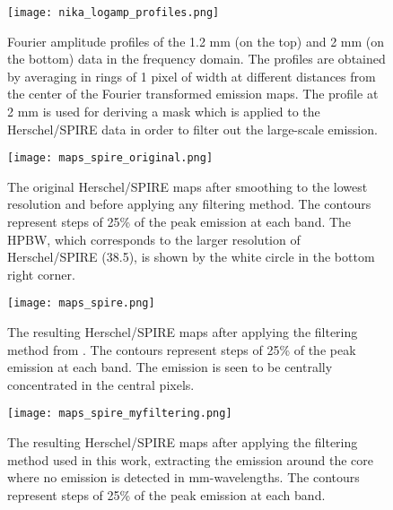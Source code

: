 \documentclass{aa}
\begin{document}
\begin{appendix}
\begin{figure} 
\begin{center}
\texttt{[image: nika\_logamp\_profiles.png]}
\end{center}
\caption{Fourier amplitude profiles of the 1.2 mm (on the top) and 2 mm (on the bottom) data in the frequency domain. The profiles are obtained by averaging in rings of 1 pixel of width at different distances from the center of the Fourier transformed emission maps. The profile at 2 mm is used for deriving a mask which is applied to the Herschel/SPIRE data in order to filter out the large-scale emission.}
\label{power}
\end{figure}

\begin{figure*} 
\begin{center}
\texttt{[image: maps\_spire\_original.png]}
\end{center}
\caption{The original Herschel/SPIRE maps after smoothing to the lowest resolution and before applying any filtering method. The contours represent steps of 25\% of the peak emission at each band. The HPBW, which corresponds to the larger resolution of Herschel/SPIRE (38.5\arcsec), is shown by the white circle in the bottom right corner.}
\label{maps_spire_original}
\end{figure*}

\begin{figure*} 
\begin{center}
\texttt{[image: maps\_spire.png]}
\end{center}
\caption{The resulting Herschel/SPIRE maps after applying the filtering method from . The contours represent steps of 25\% of the peak emission at each band. The emission is seen to be centrally concentrated in the central pixels.}
\label{maps_spire_f1}
\end{figure*}


\begin{figure*} 
\begin{center}
\texttt{[image: maps\_spire\_myfiltering.png]}
\end{center}
\caption{The resulting Herschel/SPIRE maps after applying the filtering method used in this work, extracting the emission around the core where no emission is detected in mm-wavelengths. The contours represent steps of 25\% of the peak emission at each band.}
\label{maps_spire_f2}
\end{figure*}

\end{appendix}
\end{document}
